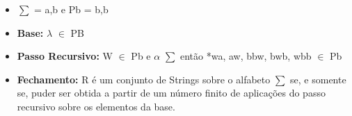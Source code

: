 \begin{question}

	\begin{itemize}
		\item $\sum$ = {a,b} e Pb = {b,b}
		
		\item \textbf{Base:} $\lambda$ $\in$ PB
		
		\item \textbf{Passo Recursivo:} W $\in$ Pb e $\alpha$ $\sum$ então *wa, aw, bbw, bwb, wbb $\in$ Pb
		
		\item \textbf{Fechamento:} R é um conjunto de Strings sobre o alfabeto $\sum$ se, e somente se, puder ser obtida a partir de um número finito de aplicações do passo recursivo sobre os elementos da base.
		
	\end{itemize}
\end{question}
